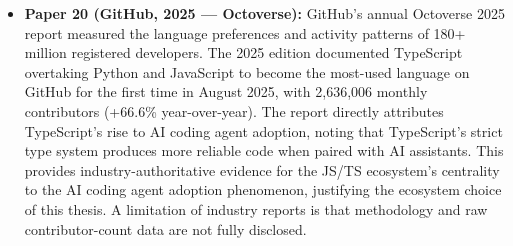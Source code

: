 \documentclass[11pt,a4paper]{article}
\begin{document}
\begin{itemize}[leftmargin=1.5em, itemsep=8pt]
    \item \textbf{Paper 20 (GitHub, 2025 --- Octoverse):}
    GitHub's annual Octoverse 2025 report measured the language preferences and activity patterns of 180+ million registered developers. The 2025 edition documented TypeScript overtaking Python and JavaScript to become the most-used language on GitHub for the first time in August 2025, with 2,636,006 monthly contributors (+66.6\% year-over-year). The report directly attributes TypeScript's rise to AI coding agent adoption, noting that TypeScript's strict type system produces more reliable code when paired with AI assistants. This provides industry-authoritative evidence for the JS/TS ecosystem's centrality to the AI coding agent adoption phenomenon, justifying the ecosystem choice of this thesis. A limitation of industry reports is that methodology and raw contributor-count data are not fully disclosed.

\end{itemize}


\newpage
\end{document}
